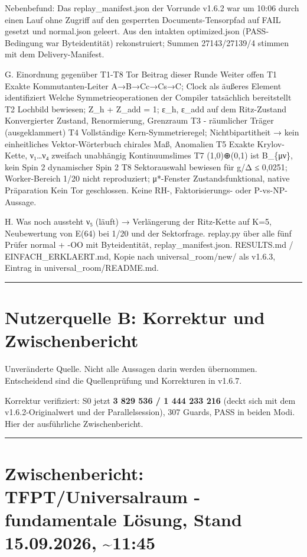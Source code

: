 Nebenbefund: Das replay\_manifest.json der Vorrunde v1.6.2 war um 10:06
durch einen Lauf ohne Zugriff auf den gesperrten Documents-Tensorpfad
auf FAIL gesetzt und normal.json geleert. Aus den intakten
optimized.json (PASS-Bedingung war Byteidentität) rekonstruiert; Summen
27143/27139/4 stimmen mit dem Delivery-Manifest.

G. Einordnung gegenüber T1-T8 Tor Beitrag dieser Runde Weiter offen T1
Exakte Kommutanten-Leiter A→B→Cc→Cs→C; Clock als äußeres Element
identifiziert Welche Symmetrieoperationen der Compiler tatsächlich
bereitstellt T2 Lochbild bewiesen; Z\_h + Z\_add = 1; ε\_h, ε\_add auf
dem Ritz-Zustand Konvergierter Zustand, Renormierung, Grenzraum T3 -
räumlicher Träger (ausgeklammert) T4 Vollständige Kern-Symmetrieregel;
Nichtbipartitheit → kein einheitliches Vektor-Wörterbuch chirales Maß,
Anomalien T5 Exakte Krylov-Kette, ν₁\ldots ν₄ zweifach unabhängig
Kontinuumslimes T7 (1,0)⊕\allowbreak{}(0,1) ist B\_\{μν\}, kein Spin 2 dynamischer
Spin 2 T8 Sektorauswahl bewiesen für g/Δ ≤ 0,0251; Worker-Bereich 1/20
nicht reproduziert; μ*-Fenster Zustandsfunktional, native Präparation
Kein Tor geschlossen. Keine RH-, Faktorisierungs- oder P-vs-NP-Aussage.

H. Was noch aussteht ν₅ (läuft) → Verlängerung der Ritz-Kette auf K=5,
Neubewertung von E(64) bei 1/20 und der Sektorfrage. replay.py über alle
fünf Prüfer normal + -OO mit Byteidentität, replay\_manifest.json.
RESULTS.md / EINFACH\_ERKLAERT.md, Kopie nach universal\_room/new/ als
v1.6.3, Eintrag in universal\_room/README.md.

\begin{center}\rule{0.5\linewidth}{0.5pt}\end{center}

\section{Nutzerquelle B: Korrektur und
Zwischenbericht}\label{nutzerquelle-b-korrektur-und-zwischenbericht}

Unveränderte Quelle. Nicht alle Aussagen darin werden übernommen.
Entscheidend sind die Quellenprüfung und Korrekturen in v1.6.7.

Korrektur verifiziert: S0 jetzt \textbf{3 829 536 / 1 444 233 216}
(deckt sich mit dem v1.6.2-Originalwert und der Parallelsession), 307
Guards, PASS in beiden Modi. Hier der ausführliche Zwischenbericht.

\begin{center}\rule{0.5\linewidth}{0.5pt}\end{center}

\section[Historischer Zwischenbericht vom 15.09.2026]{Zwischenbericht: TFPT/Universalraum - fundamentale Lösung,
Stand 15.09.2026,
\textasciitilde11:45}\label{zwischenbericht-tfptuniversalraum---fundamentale-luxf6sung-stand-15.09.2026-1145}

